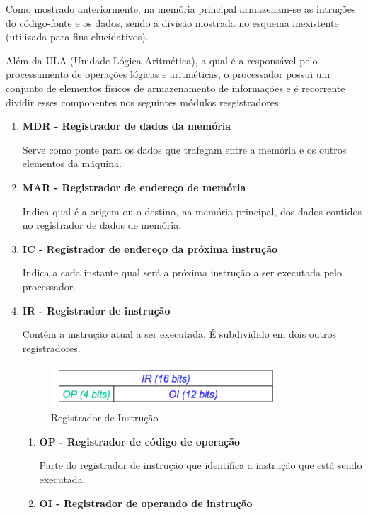 Como mostrado anteriormente, na memória principal armazenam-se as intruções do código-fonte e os dados, sendo a divisão mostrada no esquema inexistente (utilizada para fins elucidativos).


Além da ULA (Unidade Lógica Aritmética), a qual é a responsável pelo processamento de operações lógicas e aritméticas, o processador possui um conjunto de elementos físicos de armazenamento de informações e é recorrente dividir esses componentes nos seguintes módulos resgistradores:
\begin{enumerate}
	\item \textbf{MDR -  Registrador de dados da memória}
	

	Serve como ponte para os dados que trafegam entre a memória e os outros elementos da máquina.

	\item \textbf{ MAR - Registrador de endereço de memória}
	

	Indica qual é a origem ou o destino, na memória principal, dos dados contidos no registrador de dados de memória.	

	\item \textbf{IC - Registrador de endereço da próxima instrução }
	

	Indica a cada instante qual será a próxima instrução a ser executada pelo processador.

	\item \textbf{IR -  Registrador de instrução}
	

	Contém a instrução atual a ser executada. É subdividido em dois outros registradores.
	\begin{figure}[H]
		\centering 
		\includegraphics[width=0.8\textwidth]{img/ir.png}  
		\caption{Registrador de Instrução}
		\label{fig:ir}
	\end{figure}


	\begin{enumerate}
		\item \textbf{OP - Registrador de código de operação}


		Parte do registrador de instrução que identifica a instrução que está sendo executada.

		\item \textbf{OI - Registrador de operando de instrução}



\end{enumerate}
\end{enumerate}

